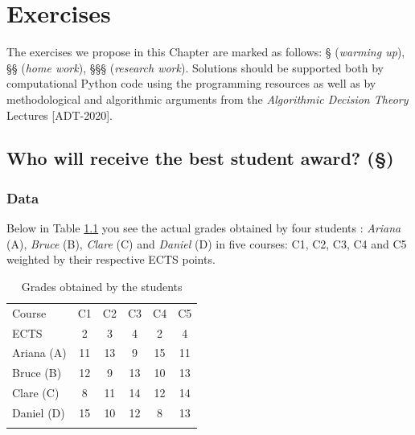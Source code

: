 \chapter{Exercises}
\label{sec:15}


The exercises we propose in this Chapter are marked as follows: § (\emph{warming up}), §§ (\emph{home work}), §§§ (\emph{research work}). Solutions should be supported both by computational Python code using the  programming resources as well as by methodological and algorithmic arguments from the \emph{Algorithmic Decision Theory} Lectures [ADT-2020].

\section{Who will receive the best student award? (§)}
\label{sec:15.1}

\subsection{Data}
\label{sec:15.1.1}

Below in Table \ref{tab:15.1} you see the actual grades obtained by four students : \emph{Ariana} (A), \emph{Bruce} (B), \emph{Clare} (C) and \emph{Daniel} (D) in five courses: C1, C2, C3, C4 and C5 weighted by their respective ECTS points. 

\begin{table}[h]
\caption{Grades obtained by the students}
\label{tab:15.1}       %
\begin{center}
    \begin{tabular}{l|c|c|c|c|c}
      \hline\noalign{\smallskip}
      Course & C1 & C2 & C3 & C4 & C5\\
      ECTS   & 2  & 3  & 4  & 2  & 4\\
      \noalign{\smallskip}\hline\noalign{\smallskip}
      Ariana (A)  &  11 & 13 &   9 & 15 &  11\\
      Bruce (B)   & 12  & 9  &  13 & 10 &  13\\
      Clare (C)   &   8 & 11 &  14 & 12 &  14\\
      Daniel (D)  &  15 & 10 &  12 &  8 &  13\\
      \noalign{\smallskip}\hline
    \end{tabular}
\end{center}
\end{table}

